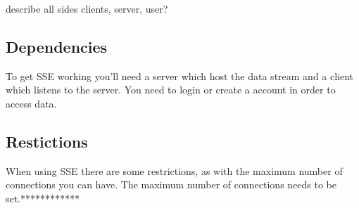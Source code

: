 \documentclass{article}
\begin{document}
describe all sides clients, server, user? 
\subsection{Dependencies}\label{dependencies}
To get SSE working you'll need a server which host the data stream and a client which listens to the server. You need to login or create a account in order to access data. 


\subsection{Restictions}\label{restrictions}
When using SSE there are some restrictions, as with the maximum number of connections you can have. The maximum number of connections needs to be set.************
\end{document}

